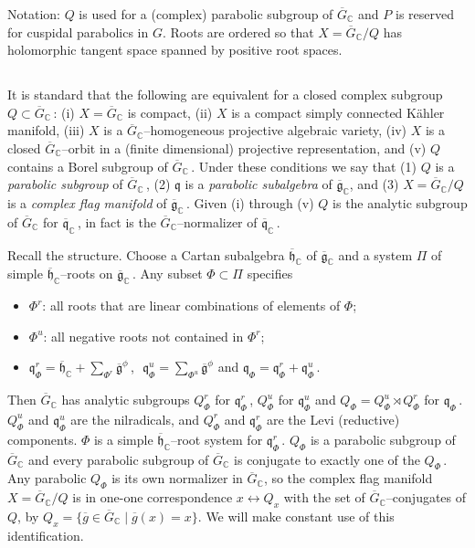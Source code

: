 \documentclass{conm-p-l}
\renewcommand{\gg}{\mathfrak{g}}
\newcommand{\gq}{\mathfrak{q}}
\def\gg{\mathfrak{g}}
\def\gh{\mathfrak{h}}
\def\gq{\mathfrak{q}}
\def\C{\mathbb{C}}
\begin{document}
Notation: $Q$ is used for a (complex) parabolic subgroup of
$\overline{G}_\C$ and $P$ is reserved for cuspidal parabolics in $G$.
Roots are ordered so that $X = \overline{G}_\C/Q$ has holomorphic
tangent space spanned by positive root spaces.

\subsection{}\label{ssec6a}\setcounter{equation}{0}
It is standard that the following are equivalent for a closed complex
subgroup $Q \subset \overline{G}_\C$\,: (i) $X = \overline{G}_\C$ is
compact, (ii) $X$ is a compact simply connected K\"ahler manifold,
(iii) $X$ is a $\overline{G}_\C$--homogeneous projective algebraic
variety, (iv) $X$ is a closed $\overline{G}_\C$--orbit in a (finite
dimensional) projective representation, and (v) $Q$ contains a Borel
subgroup of $\overline{G}_\C$\,.  Under these conditions we say that
(1) $Q$ is a {\em parabolic subgroup} of $\overline{G}_\C$\,, (2)
$\gq$ is a {\em parabolic subalgebra} of $\overline{\gg}_\C$, and
(3) $X = \overline{G}_\C/Q$ is a {\em complex flag manifold} of 
$\overline{\gg}_\C$\,.  Given (i) through (v) $Q$ is the analytic
subgroup of $\overline{G}_\C$ for $\overline{\gq}_\C$\,, in fact is
the $\overline{G}_\C$--normalizer of $\overline{\gq}_\C$\,.

Recall the structure.  Choose a Cartan subalgebra $\overline{\gh}_\C$
of $\overline{\gg}_\C$ and a system $\Pi$ of simple 
$\overline{\gh}_\C$--roots on $\overline{\gg}_\C$\,.  Any subset
$\Phi \subset \Pi$ specifies
\begin{itemize}
\item $\Phi^r$: all roots that are linear combinations of elements 
of $\Phi$;
\item $\Phi^u$: all negative roots not contained in $\Phi^r$;
\item $\gq_\Phi^r = 
	\overline{\gh}_\C + \sum_{\Phi^r} \overline{\gg}^\phi$\,,\,\,
      $\gq_\Phi^u = \sum_{\Phi^u} \overline{\gg}^\phi$ and
      $\gq_\Phi = \gq_\Phi^r + \gq_\Phi^u$\,.
\end{itemize}
Then $\overline{G}_\C$ has analytic subgroups $Q_\Phi^r$ for $\gq_\Phi^r$\,,
$Q_\Phi^u$ for $\gq_\Phi^u$ and $Q_\Phi = Q_\Phi^u\rtimes Q_\Phi^r$ for 
$\gq_\Phi$\,.  $Q_\Phi^u$ and $\gq_\Phi^u$ are the nilradicals, and
$Q_\Phi^r$ and $\gq_\Phi^r$ are the Levi (reductive) components.  
$\Phi$ is a simple $\overline{\gh}_\C$--root system for $\gq_\Phi^r$\,. 
$Q_\Phi$
is a parabolic subgroup of $\overline{G}_\C$ and every parabolic subgroup
of $\overline{G}_\C$ is conjugate to exactly one of the $Q_\Phi$\,.
Any parabolic
$Q_\Phi$ is its own normalizer in $\overline{G}_\C$, so the complex
flag manifold $X = \overline{G}_\C/Q$ is in one-one correspondence
$x \leftrightarrow Q_x$ with the set of $\overline{G}_\C$--conjugates of
$Q$, by $Q_x = \{\overline{g} \in \overline{G}_\C \mid \overline{g}(x)=x\}$.
We will make constant use of this identification.
\end{document}
